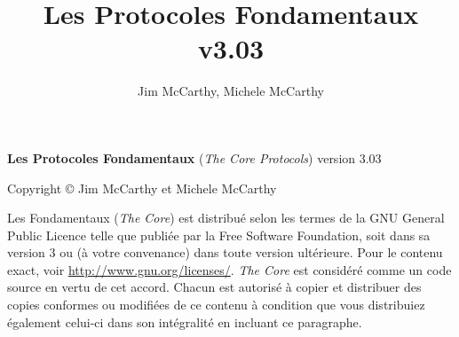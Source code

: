 \documentclass[a4paper,pagesize=pdftex,12pt]{article}
\author{Jim McCarthy, Michele McCarthy}
\title{Les Protocoles Fondamentaux v3.03}
\date{}
\begin{document}
\maketitle

\noindent \textbf{Les Protocoles Fondamentaux} (\emph{The Core Protocols}) version 3.03

\noindent Copyright \copyright{} Jim McCarthy et Michele McCarthy

\noindent Les Fondamentaux (\emph{The Core}) est distribué selon les termes de la GNU General Public Licence telle que publiée par la Free Software
Foundation, soit dans sa version 3 ou (à votre convenance) dans toute version ultérieure. Pour le contenu exact, voir
\url{http://www.gnu.org/licenses/}. \emph{The Core} est considéré comme un code source en vertu de cet accord. Chacun est autorisé
à copier et distribuer des copies conformes ou modifiées de ce contenu à condition que vous distribuiez également celui-ci
dans son intégralité en incluant ce paragraphe.
\end{document}
